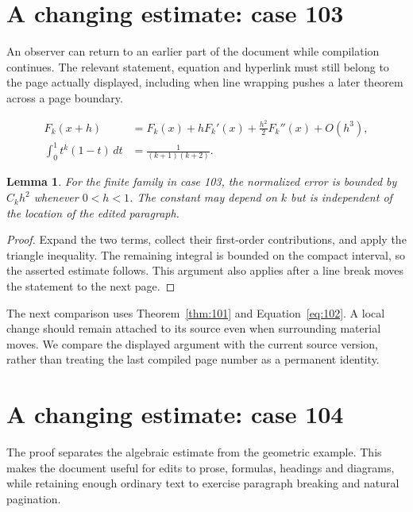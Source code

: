 \documentclass[a4paper,10pt]{article}
\newtheorem{lemma}[theorem]{Lemma}
\begin{document}
\lipsum[8]

\section{A changing estimate: case 103}\label{unit:102}
An observer can return to an earlier part of the document while compilation continues. The relevant statement, equation and hyperlink must still belong to the page actually displayed, including when line wrapping pushes a later theorem across a page boundary.

\lipsum[7-8]
\begin{align}\label{eq:102}
 F_k(x+h)&=F_k(x)+hF_k'(x)+\frac{h^2}{2}F_k''(x)+O(h^3),\\
 \int_0^1 t^k(1-t)\,dt&=\frac{1}{(k+1)(k+2)}.
\end{align}
\begin{lemma}\label{thm:102}
For the finite family in case 103, the normalized error is bounded by $C_k h^2$ whenever $0<h<1$. The constant may depend on $k$ but is independent of the location of the edited paragraph.
\end{lemma}
\begin{proof}
Expand the two terms, collect their first-order contributions, and apply the
triangle inequality. The remaining integral is bounded on the compact interval,
so the asserted estimate follows. This argument also applies after a line break
moves the statement to the next page.
\end{proof}
The next comparison uses Theorem~\ref{thm:101} and Equation~\ref{eq:102}. A local change should remain attached to its source even when surrounding material moves. We compare the displayed argument with the current source version, rather than treating the last compiled page number as a permanent identity.

\lipsum[13]

\section{A changing estimate: case 104}\label{unit:103}
The proof separates the algebraic estimate from the geometric example. This makes the document useful for edits to prose, formulas, headings and diagrams, while retaining enough ordinary text to exercise paragraph breaking and natural pagination.
\end{document}
